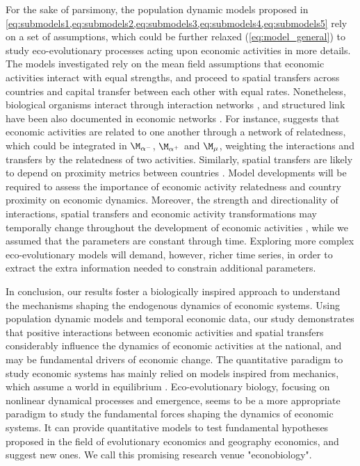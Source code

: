 For the sake of parsimony, the population dynamic models proposed in \cref{eq:submodels1,eq:submodels2,eq:submodels3,eq:submodels4,eq:submodels5} rely on a set of assumptions, which could be further relaxed (\cref{eq:model_general}) to study eco-evolutionary processes acting upon economic activities in more details. 
% 
The models investigated rely on the mean field assumptions that economic activities interact with equal strengths, and proceed to spatial transfers across countries and capital transfer between each other with equal rates.
% 
Nonetheless, biological organisms interact through interaction networks \citep{Bascompte2003}, and structured link have been also documented in economic networks  \citep{C.A.HidalgoB.Klinger,Bustos2012,Saavedra2009a,Schweitzer2009,Giuliani2007}. For instance, \cite{C.A.HidalgoB.Klinger} suggests that economic activities are related to one another through a network of relatedness, which could be integrated in $\modalphan$, $\modalphap$ and $\modmu$, weighting the interactions and transfers by the relatedness of two activities. 
% 
% 
Similarly, spatial transfers are likely to depend on proximity metrics between countries \citep{Boschma2005}. Model developments will be required to assess the importance of economic activity relatedness and country proximity on economic dynamics. Moreover, the strength and directionality of interactions, spatial transfers and economic activity transformations may temporally change throughout the development of economic activities \citep{Pistorius1997}, while we assumed that the parameters are constant through time.
% 
Exploring more complex eco-evolutionary models will demand, however, richer time series, in order to extract the extra information needed to constrain additional parameters.

In conclusion, our results foster a biologically inspired approach to understand the mechanisms shaping the endogenous dynamics of economic systems. Using population dynamic models and temporal economic data, our study demonstrates that positive interactions between economic activities and spatial transfers considerably influence the dynamics of economic activities at the national, and may be fundamental drivers of economic change.
% 
The quantitative paradigm to study economic systems has mainly relied on models inspired from mechanics, which assume a world in equilibrium \citep{sornette2014physics}.
% 
Eco-evolutionary biology, focusing on nonlinear dynamical processes and emergence, seems to be a more appropriate paradigm to study the fundamental forces shaping the dynamics of economic systems. It can provide quantitative models to test fundamental hypotheses proposed in the field of evolutionary economics and geography economics, and suggest new ones. We call this promising research venue "econobiology".

